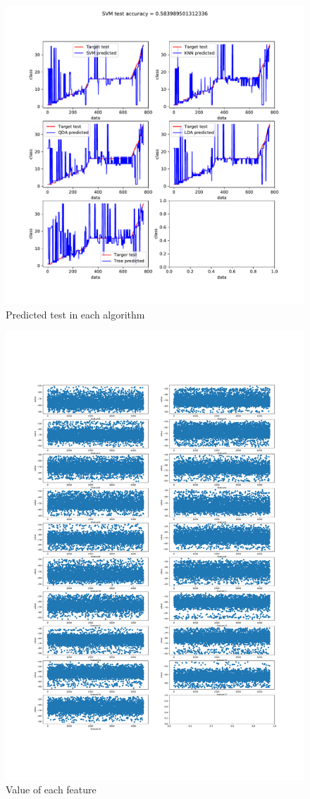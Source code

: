 \documentclass[17pt]{article}
\begin{document}
\begin{figure}
	\label{figNN}
	\includegraphics[scale=0.6]{MLACC}
	\caption{Predicted test in each algorithm}
\end{figure}

\begin{figure}
	\label{figNN}
	\includegraphics[scale=0.25]{feature}
	\caption{Value of each feature}
\end{figure}
\end{document}
